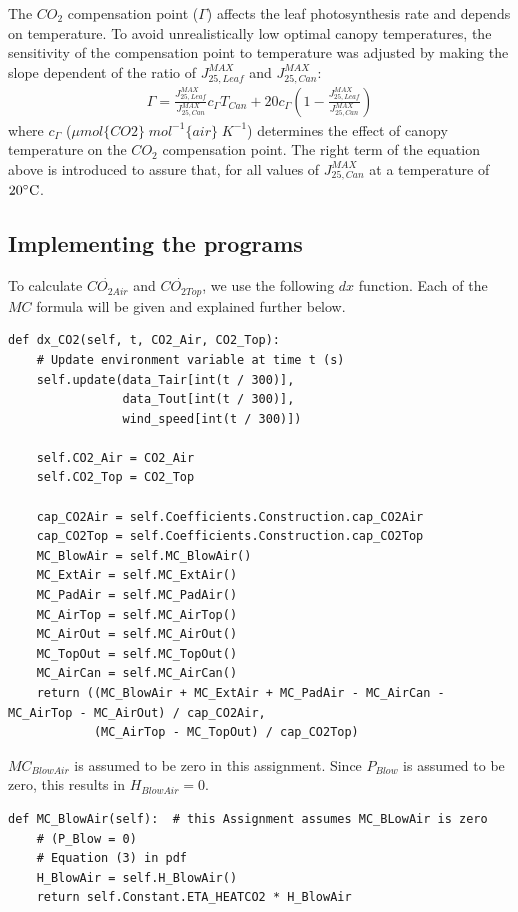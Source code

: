 \documentclass[a4paper]{article}
\begin{document}
The \(CO_2\) compensation point (\(\Gamma\)) affects the leaf photosynthesis rate and depends on temperature. To avoid unrealistically low optimal canopy temperatures, the sensitivity of the compensation point to temperature was adjusted by making the slope dependent of the ratio of \(J^{MAX}_{25,Leaf}\) and \(J^{MAX}_{25,Can}\):
\begin{align}
  \Gamma = \frac{J^{MAX}_{25,Leaf}}{J^{MAX}_{25,Can}}c_{\Gamma} T_{Can} + 20 c_{\Gamma} \left(1-\frac{J^{MAX}_{25,Leaf}}{J^{MAX}_{25,Can}}\right)
\end{align}
where \(c_{\Gamma}\) (\(\mu mol\{CO2\}\;mol^{-1}\{air\}\;K^{-1}\)) determines the effect of canopy temperature on the \(CO_2\) compensation point. The right term of the equation above is introduced to assure that, for all values of \(J^{MAX}_{25,Can}\) at a temperature of \(20 \celsius\).

\newpage
\subsection{Implementing the programs}
To calculate \(\dot{CO_{2 Air}}\) and \(\dot{CO_{2 Top}}\), we use the following \(dx\) function. Each of the \(MC\) formula will be given and explained further below.

\begin{mdframed}[leftline=false,rightline=false,backgroundcolor=magenta!10,nobreak=true]
  \begin{verbatim}
def dx_CO2(self, t, CO2_Air, CO2_Top):
    # Update environment variable at time t (s)
    self.update(data_Tair[int(t / 300)],
                data_Tout[int(t / 300)],
                wind_speed[int(t / 300)])

    self.CO2_Air = CO2_Air
    self.CO2_Top = CO2_Top

    cap_CO2Air = self.Coefficients.Construction.cap_CO2Air
    cap_CO2Top = self.Coefficients.Construction.cap_CO2Top
    MC_BlowAir = self.MC_BlowAir()
    MC_ExtAir = self.MC_ExtAir()
    MC_PadAir = self.MC_PadAir()
    MC_AirTop = self.MC_AirTop()
    MC_AirOut = self.MC_AirOut()
    MC_TopOut = self.MC_TopOut()
    MC_AirCan = self.MC_AirCan()
    return ((MC_BlowAir + MC_ExtAir + MC_PadAir - MC_AirCan - MC_AirTop - MC_AirOut) / cap_CO2Air,
            (MC_AirTop - MC_TopOut) / cap_CO2Top)
  \end{verbatim}
\end{mdframed}

\(MC_{BlowAir}\) is assumed to be zero in this assignment.
Since \(P_{Blow}\) is assumed to be zero, this results in \(H_{BlowAir} = 0\).
\begin{mdframed}[leftline=false,rightline=false,backgroundcolor=magenta!10,nobreak=true]
  \begin{verbatim}
def MC_BlowAir(self):  # this Assignment assumes MC_BLowAir is zero
    # (P_Blow = 0)
    # Equation (3) in pdf
    H_BlowAir = self.H_BlowAir()
    return self.Constant.ETA_HEATCO2 * H_BlowAir
  \end{verbatim}
\end{mdframed}
\end{document}

